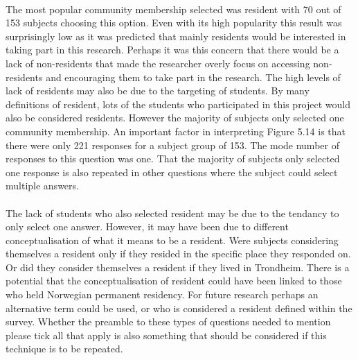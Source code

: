 \paragraph{}
The most popular community membership selected was resident with 70 out of 153 subjects choosing this option. Even with its high popularity this result was  surprisingly low as it was predicted that mainly residents would be interested in taking part in this research. Perhaps it was this concern that there would be a lack of non-residents that made the researcher overly focus on accessing non-residents and encouraging them to take part in the research. The high levels of lack of residents may also be due to the targeting of students. By many definitions of resident, lots of the students who participated in this project would also be considered residents. However the majority of subjects only selected one community membership. An important factor in interpreting Figure 5.14 is that there were only 221 responses for a subject group of 153. The mode number of responses to this question was one. That the majority of subjects only selected one response is also repeated in other questions where the subject could select multiple answers. 
\paragraph{}
The lack of students who also selected resident may be due to the tendancy to only select one answer. However, it may have been due to different conceptualisation of what it means to be a resident. Were subjects considering themselves a resident only if they resided in the specific place they responded on. Or did they consider themselves a resident if they lived in Trondheim. There is a potential that the conceptualisation of resident could have been linked to those who held Norwegian permanent residency. For future research perhaps an alternative term could be used, or who is considered a resident defined within the survey. Whether the preamble to these types of questions needed to mention please tick all that apply is also something that should be considered if this technique is to be repeated. 
\paragraph{}

